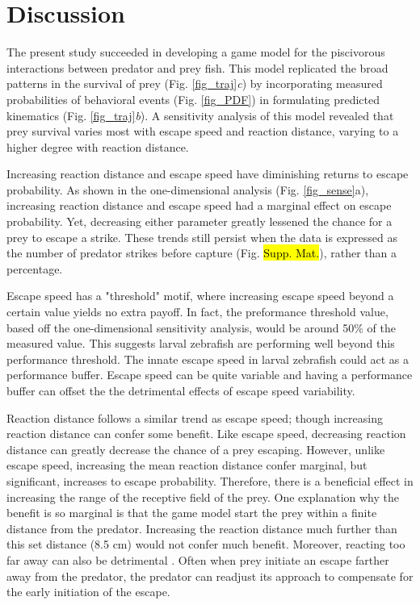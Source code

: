 \documentclass[]{rsos}%
\begin{document}
\section{Discussion} %

The present study succeeded in developing a game model for the piscivorous interactions between predator and prey fish. 
This model replicated the broad patterns in the survival of prey (Fig. \ref{fig_traj}\textit{c}) by incorporating measured probabilities of behavioral events (Fig. \ref{fig_PDF}) in formulating predicted kinematics (Fig. \ref{fig_traj}\textit{b}).
A sensitivity analysis of this model revealed that prey survival varies most with escape speed and reaction distance, varying to a higher degree with reaction distance.

Increasing reaction distance and escape speed have diminishing returns to escape probability.
As shown in the one-dimensional analysis (Fig. \ref{fig_sense}a),
increasing reaction distance and escape speed had a marginal effect on escape probability. 
Yet, decreasing either parameter greatly lessened the chance for a prey to escape a strike.
These trends still persist when the data is expressed as the number of predator strikes before capture (Fig. \hl{Supp. Mat.}), rather than a percentage.

Escape speed has a "threshold" motif, where increasing escape speed beyond a certain value yields no extra payoff. 
In fact, the preformance threshold value, based off the one-dimensional sensitivity analysis, would be around 50\% of the measured value.
This suggests larval zebrafish are performing well beyond this performance threshold. 
The innate escape speed in larval zebrafish could act as a performance buffer.
Escape speed can be quite variable and having a performance buffer can offset the the detrimental effects of escape speed variability.

Reaction distance follows a similar trend as escape speed; though increasing reaction distance can confer some benefit.
Like escape speed, decreasing reaction distance can greatly decrease the chance of a prey escaping.
However, unlike escape speed, increasing the mean reaction distance confer marginal, but significant, increases to escape probability.
Therefore, there is a beneficial effect in increasing the range of the receptive field of the prey. 
One explanation why the benefit is so marginal is that the game model start the prey within a finite distance from the predator.
Increasing the reaction distance much further than this set distance (8.5 cm) would not confer much benefit.
Moreover, reacting too far away can also be detrimental \cite{Stewart:2013bha}.
Often when prey initiate an escape farther away from the predator, the predator can readjust its approach to compensate for the early initiation of the escape.
\end{document}

